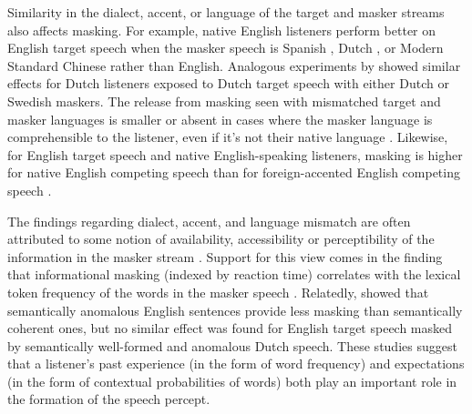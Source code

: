Similarity in the dialect, accent, or language of the target and masker streams also affects masking.  For example, native English listeners perform better on English target speech when the masker speech is Spanish \citep{GarciaLecumberriCooke2006}, Dutch \citep{BrouwerEtAl2012}, or Modern Standard Chinese \citep{VanEngenBradlow2007} rather than English.  Analogous experiments by \citet{RhebergenEtAl2005} showed similar effects for Dutch listeners exposed to Dutch target speech with either Dutch or Swedish maskers.  The release from masking seen with mismatched target and masker languages is smaller or absent in cases where the masker language is comprehensible to the listener, even if it’s not their native language \citep{GarciaLecumberriCooke2006, VanEngen2010, BrouwerEtAl2012}.  Likewise, for English target speech and native English-speaking listeners, masking is higher for native English competing speech than for foreign-accented English competing speech \citep{CalandruccioEtAl2010}.\footnotemark{}    


The findings regarding dialect, accent, and language mismatch are often attributed to some notion of availability, accessibility or perceptibility of the information in the masker stream \citep{VanEngenBradlow2007, CalandruccioEtAl2010, BrouwerEtAl2012}.  Support for this view comes in the finding that informational masking (indexed by reaction time) correlates with the lexical token frequency of the words in the masker speech \citep{BoulengerEtAl2010}.  Relatedly, \citet{BrouwerEtAl2012} showed that semantically anomalous English sentences provide less masking than semantically coherent ones, but no similar effect was found for English target speech masked by semantically well-formed and anomalous Dutch speech.  These studies suggest that a listener’s past experience (in the form of word frequency) and expectations (in the form of contextual probabilities of words) both play an important role in the formation of the speech percept.

